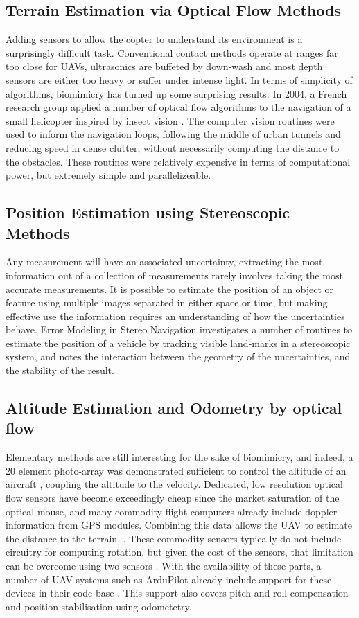 \documentclass{article}
\begin{document}
    \subsection{Terrain Estimation via Optical Flow Methods}
      Adding sensors to allow the copter to understand its environment is a surprisingly difficult task.  Conventional contact methods operate at ranges far too close for UAVs, ultrasonics are buffeted by down-wash and most depth sensors are either too heavy or suffer under intense light.
      In terms of simplicity of algorithms, biomimicry has turned up some surprising results.  In 2004, a French research group applied a number of optical flow algorithms to the navigation of a small helicopter inspired by insect vision \cite{InsectFlowMethods}.  The computer vision routines were used to inform the navigation loops, following the middle of urban tunnels and reducing speed in dense clutter, without necessarily computing the distance to the obstacles.  These routines were relatively expensive in terms of computational power, but extremely simple and parallelizeable.

    \subsection{Position Estimation using Stereoscopic Methods}
      Any measurement will have an associated uncertainty, extracting the most information out of a collection of measurements rarely involves taking the most accurate measurements.  It is possible to estimate the position of an object or feature using multiple images separated in either space or time, but making effective use the information requires an understanding of how the uncertainties behave.  Error Modeling in Stereo Navigation \cite{stereoUnc} investigates a number of routines to estimate the position of a vehicle by tracking visible land-marks in a stereoscopic system, and notes the interaction between the geometry of the uncertainties, and the stability of the result.

    \subsection{Altitude Estimation and Odometry by optical flow}
      Elementary methods are still interesting for the sake of biomimicry, and indeed, a 20 element photo-array was demonstrated sufficient to control the altitude of an aircraft \cite{optoAlt}, coupling the altitude to the velocity.
      Dedicated, low resolution optical flow sensors have become exceedingly cheap since the market saturation of the optical mouse, and many commodity flight computers already include doppler information from GPS modules. 
      Combining this data allows the UAV to estimate the distance to the terrain, \cite{RemTerrain}.  These commodity sensors typically do not include circuitry for computing rotation, but given the cost of the sensors, that limitation can be overcome using two sensors \cite{FlowRot}.
      With the availability of these parts, a number of UAV systems such as ArduPilot already include support for these devices in their code-base \cite{ArduFlow}.
      This support also covers pitch and roll compensation and position stabilisation using odometetry.
\end{document}
